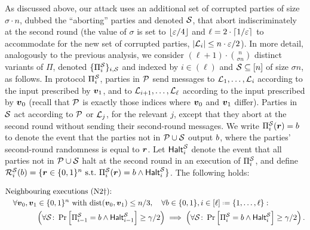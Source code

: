 As discussed above, our attack uses an additional set of corrupted parties of size $\sigma\cdot n$, dubbed the ``aborting'' parties and denoted $\mathcal{S}$, that abort indiscriminately at the second round (the value of $\sigma$ is set to $\lfloor \varepsilon/4 \rfloor$ and $\ell=2\cdot \lceil1/\varepsilon\rceil$ to accommodate for the new set of corrupted parties, \ie $\left|{\cal{L}}_i\right|\le n\cdot \varepsilon /2$). In more detail, analogously to the previous analysis, we consider $(\ell+1)\cdot \binom{n}{\sigma n}$ distinct variants of $\Pi$, denoted $\{\Pi^{\mathcal{S}}_i\}_{i,\mathcal{S}}$ and indexed by $i\in (\ell)$ and $\mathcal{S} \subseteq[n]$ of size $\sigma n$, as follows. In protocol $\Pi_i^{\mathcal{S}}$, parties in $\mathcal{P}$ send messages to ${\cal{L}}_1,\ldots, {\cal{L}}_i$ according to the input prescribed by ${ \boldsymbol{v}}_1$, and to ${\cal{L}}_{i+1},\ldots, {\cal{L}}_\ell$ according to the input prescribed by ${ \boldsymbol{v}}_0$ (recall that $\mathcal{P}$ is exactly those indices where ${ \boldsymbol{v}}_0$ and ${ \boldsymbol{v}}_1$ differ). Parties in $\mathcal{S}$ act according to $\mathcal{P}$ or ${\cal{L}}_j$, for the relevant $j$, except that they abort at the second round without sending their second-round messages. We write $\Pi^{\mathcal{S}}_i({ \boldsymbol{r}})=b$ to denote the event that the parties not in $\mathcal{P}\cup \mathcal{S}$ output $b$, where the parties' second-round randomness is equal to ${ \boldsymbol{r}}$. Let $\mathsf{Halt}^{\mathcal{S}}_i$ denote the event that all parties not in $\mathcal{P}\cup \mathcal{S}$ halt at the second round in an execution of $\Pi^{\mathcal{S}}_i$, and define $\mathcal{R}_{i }^{\mathcal{S}}(b)=\{{ \boldsymbol{r}}\in {\{0,1\}^n}\text{ s.t.\ } \Pi^{\mathcal{S}}_i({ \boldsymbol{r}})=b \land \mathsf{Halt}^{\mathcal{S}}_i\}$. The following holds:

\begin{align}\label{eq:nei3}
&\text{Neighbouring executions (N2$\dagger$):}\\
&\quad \forall \vz,\vo \in \zn \text{ with } \ham(\vz,\vo)\le n/3, \quad \forall \o\in \zo,i\in [\ell] \assign \set{1,\ldots,\ell}\colon\nonumber\\
&\qquad\qquad \left (\forall \cS\colon \pr{\Pi^\cS_{i-1}=\o \land \halt^{\cS}_{i-1}} \ge \gamma/2 \right) \implies \left(\forall \cS\colon\pr{\Pi^\cS_{i}=\o \land \halt^{\cS}_{i}}\ge \gamma/2\right). \nonumber
\end{align}

